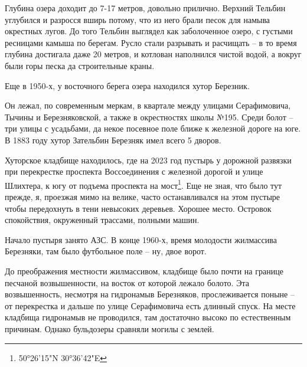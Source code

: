 Глубина озера доходит до 7-17 метров, довольно прилично. Верхний Тельбин углубился и разросся вширь потому, что из него брали песок для намыва окрестных лугов. До того Тельбин выглядел как заболоченное озеро, с густыми ресницами камыша по берегам. Русло стали разрывать и расчищать – в то время глубина достигала даже 20 метров, и котлован наполнился чистой водой, а вокруг были горы песка да строительные краны.

Еще в 1950-х, у восточного берега озера находился хутор Березник.

Он лежал, по современным меркам, в квартале между улицами Серафимовича, Тычины и Березняковской, а также в окрестностях школы №195. Среди болот – три улицы с усадьбами, да некое посевное поле ближе к железной дороге на юге. В 1883 году хутор Зательбин Березняк имел всего 5 дворов.

Хуторское кладбище находилось, где на 2023 год пустырь у дорожной развязки при перекрестке проспекта Воссоединения с железной дорогой и улице Шлихтера, к югу от подъема проспекта на мост\footnote{50°26'15"N 30°36'42"E}. Еще не зная, что было тут прежде, я, проезжая мимо на велике, часто останавливался на этом пустыре чтобы передохнуть в тени невысоких деревьев. Хорошее место. Островок спокойствия, окруженный трассами, полными машин.

Начало пустыря занято АЗС. В конце 1960-х, время молодости жилмассива Березняки, там было футбольное поле – ну, двое ворот. 





До преображения местности жилмассивом, кладбище было почти на границе песчаной возвышенности, на восток от которой лежало болото. Эта возвышенность, несмотря на гидронамыв Березняков, прослеживается поныне – от перекрестка и дальше по улице Серафимовича есть длинный спуск. На месте кладбища гидронамыв не проводился, там достаточно высоко по естественным причинам. Однако бульдозеры сравняли могилы с землей.

